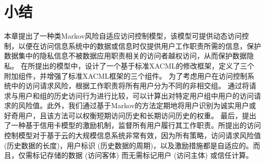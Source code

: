 \section{小结}
\label{sec:Conclusion}

本章提出了一种类Markov风险自适应访问控制模型，该模型可提供动态访问控制，以便在访问信息系统中的数据或信息时仅提供用户工作职责所需的信息，保护数据集中的隐私信息不被数据应用职责相关的访问者越权访问，从而保护数据隐私。 在所提出的模型中，设计了一个基于标准XACML的修改框架，定义了三个附加组件，并增强了标准XACML框架的三个组件。 为了考虑用户在访问控制系统中的访问请求风险，根据工作职责将所有用户分为不同的非相交组。 通过将请求与用户和组的历史访问行为进行比较，可以计算出对特定用户组中用户的访问请求的风险值。此外，我们通过基于Markov的方法定期地将用户识别为诚实用户或好奇用户，且该方法可以权衡短期访问历史和长期访问历史的权重。 最后，提出了一种基于信用卡模型的激励机制，监督所有用户履行其工作职责。所提出的访问控制模型对于基于云的大规模信息系统非常有效，因为所有策略，访问请求风险值 (历史数据的长度)，用户标识 (历史数据的周期)，以及激励措施都是自适应的。而且，仅需标记存储的数据 (访问客体) 而无需标记用户 (访问主体) 或信任计算。
